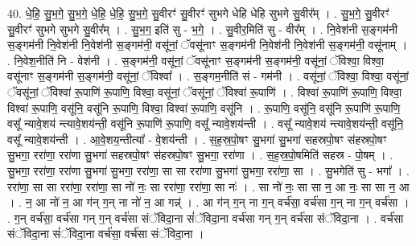 \documentclass[17pt]{extarticle}
\begin{document}
40. धे॒हि॒ सु॒भ॒गे॒ सु॒भ॒गे॒ धे॒हि॒ धे॒हि॒ सु॒भ॒गे॒ सु॒वीरꣳ॑ सु॒वीरꣳ॑ सुभगे धेहि धेहि सुभगे सु॒वीर᳚म् । . सु॒भ॒गे॒ सु॒वीरꣳ॑ सु॒वीरꣳ॑ सुभगे सुभगे सु॒वीर᳚म् । . सु॒भ॒ग॒ इति॑ सु - भ॒गे॒ । . सु॒वीर॒मिति॑ सु - वीर᳚म् । . नि॒वेश॑नी स॒ङ्गम॑नी स॒ङ्गम॑नी नि॒वेश॑नी नि॒वेश॑नी स॒ङ्गम॑नी॒ वसू॑नां॒ ॅवसू॑नाꣳ स॒ङ्गम॑नी नि॒वेश॑नी नि॒वेश॑नी स॒ङ्गम॑नी॒ वसू॑नाम् । . नि॒वेश॒नीति॑ नि - वेश॑नी । . स॒ङ्गम॑नी॒ वसू॑नां॒ ॅवसू॑नाꣳ स॒ङ्गम॑नी स॒ङ्गम॑नी॒ वसू॑नां॒ ॅविश्वा॒ विश्वा॒ वसू॑नाꣳ स॒ङ्गम॑नी स॒ङ्गम॑नी॒ वसू॑नां॒ ॅविश्वा᳚ । . स॒ङ्गम॒नीति॑ सं - गम॑नी । . वसू॑नां॒ ॅविश्वा॒ विश्वा॒ वसू॑नां॒ ॅवसू॑नां॒ ॅविश्वा॑ रू॒पाणि॑ रू॒पाणि॒ विश्वा॒ वसू॑नां॒ ॅवसू॑नां॒ ॅविश्वा॑ रू॒पाणि॑ । . विश्वा॑ रू॒पाणि॑ रू॒पाणि॒ विश्वा॒ विश्वा॑ रू॒पाणि॒ वसू॑नि॒ वसू॑नि रू॒पाणि॒ विश्वा॒ विश्वा॑ रू॒पाणि॒ वसू॑नि । . रू॒पाणि॒ वसू॑नि॒ वसू॑नि रू॒पाणि॑ रू॒पाणि॒ वसू᳚ न्यावे॒शय॑ न्त्यावे॒शय॑न्ती॒ वसू॑नि रू॒पाणि॑ रू॒पाणि॒ 
वसू᳚ न्यावे॒शय॑न्ती । . वसू᳚ न्यावे॒शय॑ न्त्यावे॒शय॑न्ती॒ वसू॑नि॒ वसू᳚ न्यावे॒शय॑न्ती । . आ॒वे॒शय॒न्तीत्या᳚ - वे॒शय॑न्ती । . स॒ह॒स्र॒पो॒षꣳ सु॒भगा॑ सु॒भगा॑ सहस्रपो॒षꣳ स॑हस्रपो॒षꣳ सु॒भगा॒ ररा॑णा॒ ररा॑णा सु॒भगा॑ सहस्रपो॒षꣳ स॑हस्रपो॒षꣳ सु॒भगा॒ ररा॑णा । . स॒ह॒स्र॒पो॒षमिति॑ सहस्र - पो॒षम् । . सु॒भगा॒ ररा॑णा॒ ररा॑णा सु॒भगा॑ सु॒भगा॒ ररा॑णा॒ सा सा ररा॑णा सु॒भगा॑ सु॒भगा॒ ररा॑णा॒ सा । . सु॒भगेति॑ सु - भगा᳚ । . ररा॑णा॒ सा सा ररा॑णा॒ ररा॑णा॒ सा नो॑ नः॒ सा ररा॑णा॒ ररा॑णा॒ सा नः॑ । . सा नो॑ नः॒ सा सा न॒ आ नः॒ सा सा न॒ आ । . न॒ आ नो॑ न॒ आ ग॑न् ग॒न् ना नो॑ न॒ आ गन्न्॑ । . आ ग॑न् ग॒न् ना ग॒न् वर्च॑सा॒ वर्च॑सा ग॒न् ना ग॒न् वर्च॑सा । . ग॒न् वर्च॑सा॒ वर्च॑सा गन् ग॒न् वर्च॑सा संॅविदा॒ना सं॑ॅविदा॒ना वर्च॑सा गन् ग॒न् वर्च॑सा संॅविदा॒ना । . वर्च॑सा संॅविदा॒ना सं॑ॅविदा॒ना वर्च॑सा॒ वर्च॑सा संॅविदा॒ना । \newline
\pagebreak
{}
\end{document}
